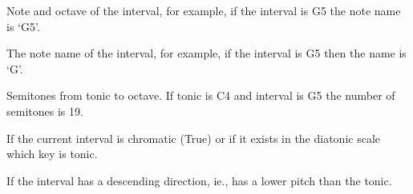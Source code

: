 \documentclass[letterpaper,10pt,english]{sphinxmanual}
\begin{document}
\begin{fulllineitems}
\begin{fulllineitems}
\label{\detokenize{birdears:birdears.interval.Interval.note_and_octave}}
 \textendash{} Note and octave of the interval, for example, if
the interval is G5 the note name is ‘G5’.

\end{fulllineitems}


\begin{fulllineitems}
\label{\detokenize{birdears:birdears.interval.Interval.note_name}}
 \textendash{} The note name of the interval, for example, if the
interval is G5 then the name is ‘G’.

\end{fulllineitems}


\begin{fulllineitems}
\label{\detokenize{birdears:birdears.interval.Interval.semitones}}
 \textendash{} Semitones from tonic to octave. If tonic is C4 and
interval is G5 the number of semitones is 19.

\end{fulllineitems}


\begin{fulllineitems}
\label{\detokenize{birdears:birdears.interval.Interval.is_chromatic}}
 \textendash{} If the current interval is chromatic (True) or if
it exists in the diatonic scale which key is tonic.

\end{fulllineitems}


\begin{fulllineitems}
\label{\detokenize{birdears:birdears.interval.Interval.is_descending}}
 \textendash{} If the interval has a descending direction, ie.,
has a lower pitch than the tonic.


\end{fulllineitems}
\end{fulllineitems}
\end{document}
